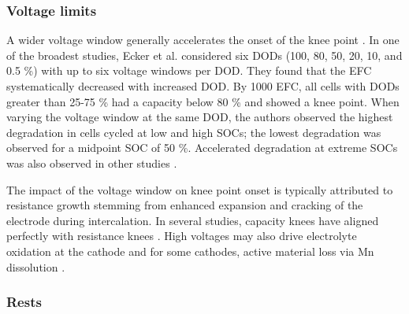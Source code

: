 \documentclass[journal=jpcl, manuscript=article, layout=onecolumn]{achemso}
\begin{document}
\subsubsection{Voltage limits} 
A wider voltage window generally accelerates the onset of the knee point \cite{ecker_calendar_2014, pfrang_long-term_2018, klett_non-uniform_2014, ma_novel_2019, petzl_lithium_2015, schuster_nonlinear_2015}. In one of the broadest studies, Ecker et al. \cite{ecker_calendar_2014} considered six DODs (100, 80, 50, 20, 10, and 0.5 \%) with up to six voltage windows per DOD. They found that the EFC systematically decreased with increased DOD. By 1000 EFC, all cells with DODs greater than 25-75 \% had a capacity below 80 \% and showed a knee point. When varying the voltage window at the same DOD, the authors observed the highest degradation in cells cycled at low and high SOCs; the lowest degradation was observed for a midpoint SOC of 50 \%. Accelerated degradation at extreme SOCs was also observed in other studies \cite{aiken_accelerated_2020,ma_novel_2019, zhu_investigation_2021}.

The impact of the voltage window on knee point onset is typically attributed to resistance growth stemming from enhanced expansion and cracking of the electrode during intercalation. In several studies, capacity knees have aligned perfectly with resistance knees \cite{ecker_calendar_2014, klett_non-uniform_2014, schuster_nonlinear_2015, zhu_investigation_2021}. High voltages may also drive electrolyte oxidation at the cathode \cite{aiken_accelerated_2020} and for some cathodes, active material loss via Mn dissolution \cite{ma_novel_2019}. 



\subsubsection{Rests}
\end{document}
